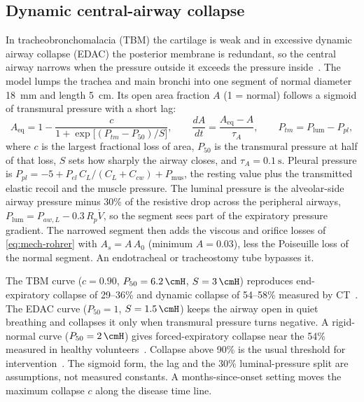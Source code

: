 \subsection{Dynamic central-airway collapse}
\label{sec:mech-tbm}
In tracheobronchomalacia (TBM) the cartilage is weak and in excessive dynamic airway collapse (EDAC) the posterior membrane is redundant, so the central airway narrows when the pressure outside it exceeds the pressure inside~\citep{murgu2006,ernst2004}. The model lumps the trachea and main bronchi into one segment of normal diameter \SI{18}{\milli\meter} and length \SI{5}{\centi\meter}. Its open area fraction $A$ (1 = normal) follows a sigmoid of transmural pressure with a short lag:
\begin{equation}
A_{\mathrm{eq}}=1-\frac{c}{1+\exp\bigl[(P_{tm}-P_{50})/S\bigr]},\qquad
\frac{dA}{dt}=\frac{A_{\mathrm{eq}}-A}{\tau_A},\qquad
P_{tm}=P_{\mathrm{lum}}-P_{pl},
\label{eq:mech-tbm}
\end{equation}
where $c$ is the largest fractional loss of area, $P_{50}$ is the transmural pressure at half of that loss, $S$ sets how sharply the airway closes, and $\tau_A = \SI{0.1}{\second}$. Pleural pressure is $P_{pl}=-5+P_{el}\,C_L/(C_L+C_{cw})+P_{\mathrm{mus}}$, the resting value plus the transmitted elastic recoil and the muscle pressure. The luminal pressure is the alveolar-side airway pressure minus 30\% of the resistive drop across the peripheral airways, $P_{\mathrm{lum}}=P_{aw,L}-0.3\,R_p\dot V$, so the segment sees part of the expiratory pressure gradient. The narrowed segment then adds the viscous and orifice losses of \cref{eq:mech-rohrer} with $A_s=A\,A_0$ (minimum $A=0.03$), less the Poiseuille loss of the normal segment. An endotracheal or tracheostomy tube bypasses it.

The TBM curve ($c=0.90$, $P_{50}=\SI{6.2}{\cmH}$, $S=\SI{3}{\cmH}$) reproduces end-expiratory collapse of 29--36\% and dynamic collapse of 54--58\% measured by CT~\citep{baroni2005}. The EDAC curve ($P_{50}=1$, $S=\SI{1.5}{\cmH}$) keeps the airway open in quiet breathing and collapses it only when transmural pressure turns negative. A rigid-normal curve ($P_{50}=\SI{2}{\cmH}$) gives forced-expiratory collapse near the 54\% measured in healthy volunteers~\citep{boiselle2009}. Collapse above 90\% is the usual threshold for intervention~\citep{buitrago2017}. The sigmoid form, the lag and the 30\% luminal-pressure split are assumptions, not measured constants. A months-since-onset setting moves the maximum collapse $c$ along the disease time line.

